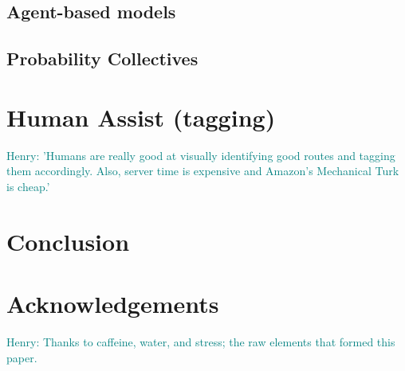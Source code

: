 \documentclass{sig-alternate}
\newcommand{\allcomments}[1]{{#1}}
\newcommand{\hfcomment}[1]{\textcolor{Teal}{\allcomments{Henry: {#1}}}}
\begin{document}
\subsection{Agent-based models}
\label{ssec:agents}

\subsection{Probability Collectives}
\label{ssec:PC}

\section{Human Assist (tagging)}
\label{sec:humans}
\hfcomment{'Humans are really good at visually identifying good routes and tagging them accordingly. Also, server time is expensive and Amazon's Mechanical Turk is cheap.'}

\section{Conclusion}
\label{conclusion}

\section{Acknowledgements}
\hfcomment{Thanks to caffeine, water, and stress; the raw elements that formed this paper.}

  
\end{document}
